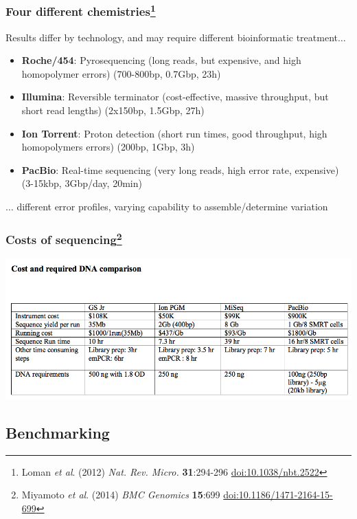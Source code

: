 \begin{frame}
  \frametitle{Four different chemistries\footnote{\tiny{Loman \textit{et al}. (2012) \textit{Nat. Rev. Micro.} \textbf{31}:294-296 \href{http://dx.doi.org/10.1038/nbt.2522}{doi:10.1038/nbt.2522}}}}
  Results differ by technology, and may require different bioinformatic treatment$\ldots$
  \begin{itemize}
    \item \textbf{Roche/454}: Pyrosequencing (long reads, but expensive, and high homopolymer errors) (700-800bp, 0.7Gbp, 23h)
    \item \textbf{Illumina}: Reversible terminator (cost-effective, massive throughput, but short read lengths) (2x150bp, 1.5Gbp, 27h)
    \item \textbf{Ion Torrent}: Proton detection (short run times, good throughput, high homopolymers errors) (200bp, 1Gbp, 3h)
    \item \textbf{PacBio}: Real-time sequencing (very long reads, high error rate, expensive) (3-15kbp, 3Gbp/day, 20min)
  \end{itemize}
  $\ldots$ different error profiles, varying capability to assemble/determine variation
\end{frame}

\begin{frame}
  \frametitle{Costs of sequencing\footnote{\tiny{Miyamoto \textit{et al}. (2014) \textit{BMC Genomics} \textbf{15}:699 \href{http://dx.doi.org/10.1186/1471-2164-15-699}{doi:10.1186/1471-2164-15-699}}}}
    \begin{center}
      \includegraphics[width=1\textwidth]{images/miyamoto_costs}
    \end{center}      
\end{frame}

\subsection{Benchmarking}

